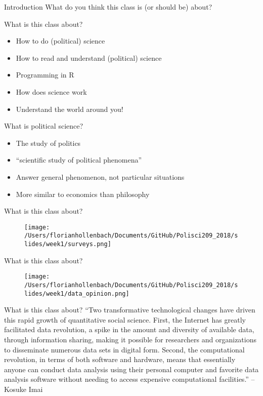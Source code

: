 \documentclass[presentation]{beamer}
\begin{document}
\begin{frame}[label={sec:orge28b93f}]{Introduction}
What do you think this class is (or should be) about?
\end{frame}


\begin{frame}[label={sec:orgd3c9e13}]{What is this class about?}
\begin{itemize}
\item How to do (political) science
\item How to read and understand (political) science
\item Programming in R
\item How does science work
\item Understand the world around you!
\end{itemize}
\end{frame}

\begin{frame}[label={sec:orgd22501e}]{What is political science?}
\begin{itemize}
\item The study of politics
\item “scientific study of political phenomena”
\item Answer general phenomenon, not particular situations
\item More similar to economics than philosophy
\end{itemize}
\end{frame}

\begin{frame}[label={sec:orgf9d6c61}]{What is this class about?}
\begin{figure}[htbp]
\centering
\texttt{[image: /Users/florianhollenbach/Documents/GitHub/Polisci209\_2018/slides/week1/surveys.png]}
\label{fig:org7013a26}
\end{figure}
\end{frame}

\begin{frame}[label={sec:orgbc527bb}]{What is this class about?}
\begin{figure}[htbp]
\centering
\texttt{[image: /Users/florianhollenbach/Documents/GitHub/Polisci209\_2018/slides/week1/data\_opinion.png]}
\label{fig:org90865f1}
\end{figure}
\end{frame}


\begin{frame}[label={sec:orga10c10f}]{What is this class about?}
``Two transformative technological changes have driven this rapid growth of quantitative social science. First, the Internet has greatly facilitated data revolution, a spike in the amount and diversity of available data, through information sharing, making it possible for researchers and organizations to disseminate numerous data sets in digital form. Second, the computational revolution, in terms of both software and hardware, means that essentially anyone can conduct data analysis using their personal computer and favorite data analysis software without needing to access expensive computational facilities.'' -- Kosuke Imai
\end{frame}
\end{document}
